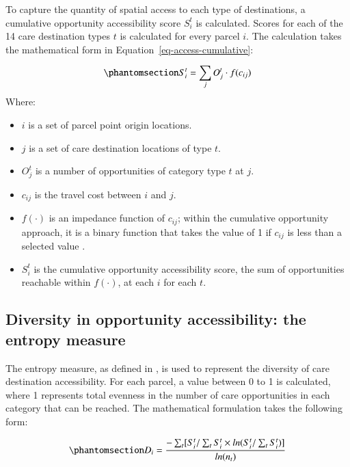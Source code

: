 \documentclass[
  authoryear,
  preprint,
  3p]{elsarticle}
\providecommand{\tightlist}{%
  \setlength{\itemsep}{0pt}\setlength{\parskip}{0pt}}\usepackage{longtable,booktabs,array}
\def\tightlist{}
\begin{document}
To capture the quantity of spatial access to each type of destinations,
a cumulative opportunity accessibility score \(S^t_i\) is calculated.
Scores for each of the 14 care destination types \(t\) is calculated for
every parcel \(i\). The calculation takes the mathematical form in
Equation~\ref{eq-access-cumulative}:

\begin{equation}\phantomsection\label{eq-access-cumulative}{
S^t_i=\sum_{j}O_j^{t}\cdot f(c_{ij})
}\end{equation} \noindent Where:

\begin{itemize}
\tightlist
\item
  \(i\) is a set of parcel point origin locations.
\item
  \(j\) is a set of care destination locations of type \(t\).
\item
  \(O^t_j\) is a number of opportunities of category type \(t\) at
  \(j\).
\item
  \(c_{ij}\) is the travel cost between \(i\) and \(j\).
\item
  \(f(\cdot)\) is an impedance function of \(c_{ij}\); within the
  cumulative opportunity approach, it is a binary function that takes
  the value of 1 if \(c_{ij}\) is less than a selected value
  \citep{handyMeasuringAccessibilityExploration1997}.
\item
  \(S_{i}^t\) is the cumulative opportunity accessibility score, the sum
  of opportunities reachable within \(f(\cdot)\), at each \(i\) for each
  \(t\).
\end{itemize}

\subsection{Diversity in opportunity accessibility: the entropy
measure}\label{diversity-in-opportunity-accessibility-the-entropy-measure}

The entropy measure, as defined in \citet{cerveroTravelDemand3Ds1997},
is used to represent the diversity of care destination accessibility.
For each parcel, a value between 0 to 1 is calculated, where 1
represents total evenness in the number of care opportunities in each
category that can be reached. The mathematical formulation takes the
following form:

\begin{equation}\phantomsection\label{eq-entropy-measure}{
D_{i} = \frac{-\sum_{t} [S_i^{t} / \sum_{t}S^{t}_{i} \times ln(S_i^{t} / \sum_{t}S^{t}_{i} )]}{ln(n_t)}
}\end{equation}
\end{document}
